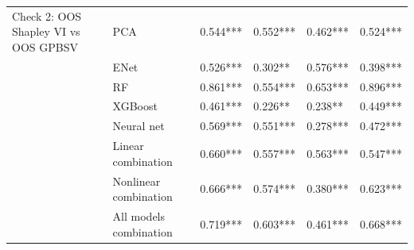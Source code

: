 \begin{tabular}{llllll}
Check 2: OOS Shapley VI vs OOS GPBSV & PCA &  0.544*** &  0.552*** &  0.462*** &  0.524*** \\
                                     & ENet &  0.526*** &   0.302** &  0.576*** &  0.398*** \\
                                     & RF &  0.861*** &  0.554*** &  0.653*** &  0.896*** \\
                                     & XGBoost &  0.461*** &   0.226** &   0.238** &  0.449*** \\
                                     & Neural net &  0.569*** &  0.551*** &  0.278*** &  0.472*** \\
                                     & Linear combination &  0.660*** &  0.557*** &  0.563*** &  0.547*** \\
                                     & Nonlinear combination &  0.666*** &  0.574*** &  0.380*** &  0.623*** \\
                                     & All models combination &  0.719*** &  0.603*** &  0.461*** &  0.668*** \\
\bottomrule
\end{tabular}
